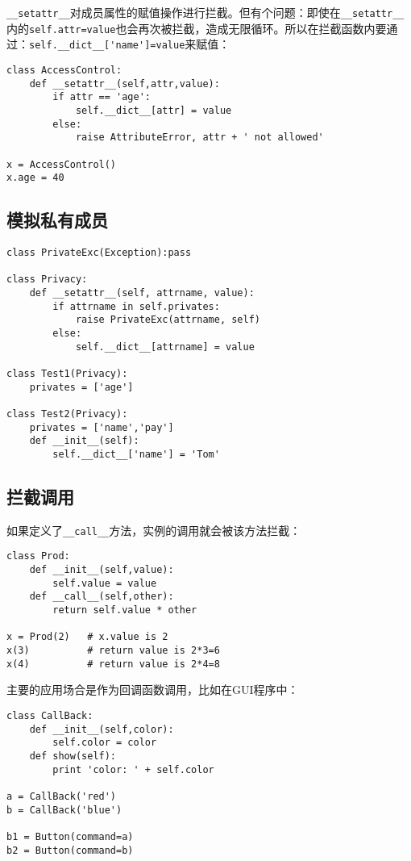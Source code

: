 \verb|__setattr__|对成员属性的赋值操作进行拦截。但有个问题：即使在\verb|__setattr__|内的\verb|self.attr=value|也会再次被拦截，造成无限循环。所以在拦截函数内要通过：\verb|self.__dict__['name']=value|来赋值：

\begin{lstlisting}
class AccessControl:
	def __setattr__(self,attr,value):
		if attr == 'age':
			self.__dict__[attr] = value
		else:
			raise AttributeError, attr + ' not allowed'

x = AccessControl()
x.age = 40
\end{lstlisting}

\subsection{模拟私有成员}

\begin{lstlisting}
class PrivateExc(Exception):pass

class Privacy:
	def __setattr__(self, attrname, value):
		if attrname in self.privates:
			raise PrivateExc(attrname, self)
		else:
			self.__dict__[attrname] = value

class Test1(Privacy):
	privates = ['age']

class Test2(Privacy):
	privates = ['name','pay']
	def __init__(self):
		self.__dict__['name'] = 'Tom'
\end{lstlisting}

\subsection{拦截调用}

如果定义了\verb|__call__|方法，实例的调用就会被该方法拦截：

\begin{lstlisting}
class Prod:
	def __init__(self,value):
		self.value = value
	def __call__(self,other):
		return self.value * other

x = Prod(2)   # x.value is 2
x(3)          # return value is 2*3=6
x(4)          # return value is 2*4=8
\end{lstlisting}

主要的应用场合是作为回调函数调用，比如在GUI程序中：

\begin{lstlisting}
class CallBack:
	def __init__(self,color):
		self.color = color
	def show(self):
		print 'color: ' + self.color

a = CallBack('red')
b = CallBack('blue')

b1 = Button(command=a)
b2 = Button(command=b)
\end{lstlisting}

